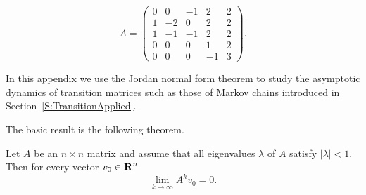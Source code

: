 \documentclass{ximera}
\begin{document}
\begin{exercise} \label{E:jnfmf}
\begin{equation*}
A = \left(\begin{array}{rrrrr} 
     0   &  0  &  -1  &   2   &  2\\
     1   & -2  &   0   &  2   &  2\\
     1   & -1  &  -1   &  2   &  2\\
     0   &  0  &   0   &  1   &  2\\
     0   &  0  &   0   & -1   &  3
 \end{array}\right). 
\end{equation*}
\end{exercise}



\label{S:TransitionTheory} 

In this appendix we use the Jordan normal form theorem to study the asymptotic
dynamics of transition matrices such as those of 
Markov chains introduced in 
Section~\ref{S:TransitionApplied}.

The basic result is the following theorem.
\begin{thm} \label{T:convergeto0}
Let $A$ be an $n\times n$ matrix and assume that all eigenvalues $\lambda$ of 
$A$ satisfy $|\lambda|<1$.  Then for every vector $v_0\in\mbox{$\bf{R}$}^n$
\begin{equation}  \label{E:convergeto0}
\lim_{k\to\infty} A^kv_0 = 0.
\end{equation}
\end{thm}
\end{document}
